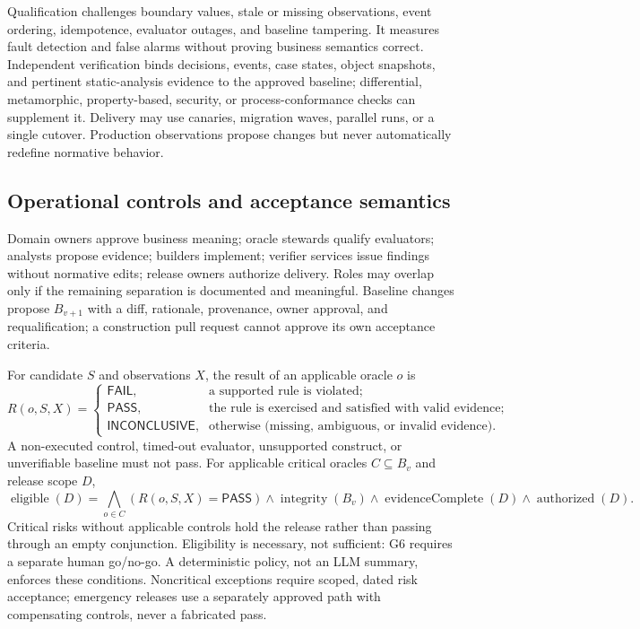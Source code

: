 \documentclass[11pt,a4paper]{article}
\newcommand{\PASS}{\textsf{PASS}}
\newcommand{\FAIL}{\textsf{FAIL}}
\newcommand{\INC}{\textsf{INCONCLUSIVE}}
\begin{document}
Qualification challenges boundary values, stale or missing observations, event ordering, idempotence, evaluator outages, and baseline tampering. It measures fault detection and false alarms without proving business semantics correct. Independent verification binds decisions, events, case states, object snapshots, and pertinent static-analysis evidence to the approved baseline; differential, metamorphic, property-based, security, or process-conformance checks can supplement it. Delivery may use canaries, migration waves, parallel runs, or a single cutover. Production observations propose changes but never automatically redefine normative behavior.


\subsection{Operational controls and acceptance semantics}
Domain owners approve business meaning; oracle stewards qualify evaluators; analysts propose evidence; builders implement; verifier services issue findings without normative edits; release owners authorize delivery. Roles may overlap only if the remaining separation is documented and meaningful. Baseline changes propose $B_{v+1}$ with a diff, rationale, provenance, owner approval, and requalification; a construction pull request cannot approve its own acceptance criteria.

For candidate $S$ and observations $X$, the result of an applicable oracle $o$ is
\begin{equation}
R(o,S,X)=\begin{cases}
\FAIL{}, & \text{a supported rule is violated};\\
\PASS{}, & \text{the rule is exercised and satisfied with valid evidence};\\
\INC{}, & \text{otherwise (missing, ambiguous, or invalid evidence).}
\end{cases}
\label{eq:tristate}
\end{equation}
A non-executed control, timed-out evaluator, unsupported construct, or unverifiable baseline must not pass. For applicable critical oracles $C\subseteq B_v$ and release scope $D$,
\begin{equation}
\operatorname{eligible}(D)=\bigwedge_{o\in C}(R(o,S,X)=\PASS{})
\land\operatorname{integrity}(B_v)\land\operatorname{evidenceComplete}(D)
\land\operatorname{authorized}(D).
\end{equation}
Critical risks without applicable controls hold the release rather than passing through an empty conjunction. Eligibility is necessary, not sufficient: G6 requires a separate human go/no-go. A deterministic policy, not an LLM summary, enforces these conditions. Noncritical exceptions require scoped, dated risk acceptance; emergency releases use a separately approved path with compensating controls, never a fabricated pass.
\end{document}
